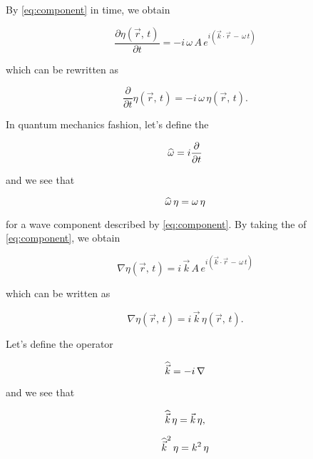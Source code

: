 By  \eqref{eq:component} in time, we obtain

\begin{equation}
\frac{\partial\eta(\vec{r},\,t)}{\partial t} = -i\,\omega\,A\,e^{i(\vec{k}\cdot\vec{r}\,-\,\omega\,t)}
\end{equation}

which can be rewritten as

\begin{equation}
\frac{\partial}{\partial t}\eta(\vec{r},\,t) = -i\,\omega\,\eta(\vec{r},\,t).
\end{equation}

In quantum mechanics fashion, let's define the 

\begin{equation} \label{eq:opomega}
\widehat{\omega} = i\frac{\partial}{\partial t}
\end{equation}

and we see that

\begin{equation} \label{eq:opomegaaction}
\widehat{\omega}\,\eta = \omega\,\eta
\end{equation}

for a wave component described by \eqref{eq:component}. By taking the  of \eqref{eq:component}, we obtain

\begin{equation}
\nabla\eta(\vec{r},\,t) = i\,\vec{k}\,A\,e^{i(\vec{k}\cdot\vec{r}\,-\,\omega\,t)}
\end{equation}

which can be written as

\begin{equation}
\nabla\eta(\vec{r},\,t) = i\,\vec{k}\,\eta(\vec{r},\,t).
\end{equation}

Let's define the operator

\begin{equation} \label{eq:opkvec}
\widehat{\vec{k}} = -i\,\nabla
\end{equation}

and we see that 

\begin{samepage}
\begin{equation} \label{eq:opkvec1action}
\vop{k}\,\eta = \vec{k}\,\eta,%
\end{equation}

\begin{equation} \label{eq:opkvec2action}
{\widehat{\vec{k}}}^2\,\eta = k^2\,\eta
\end{equation}
\end{samepage}

